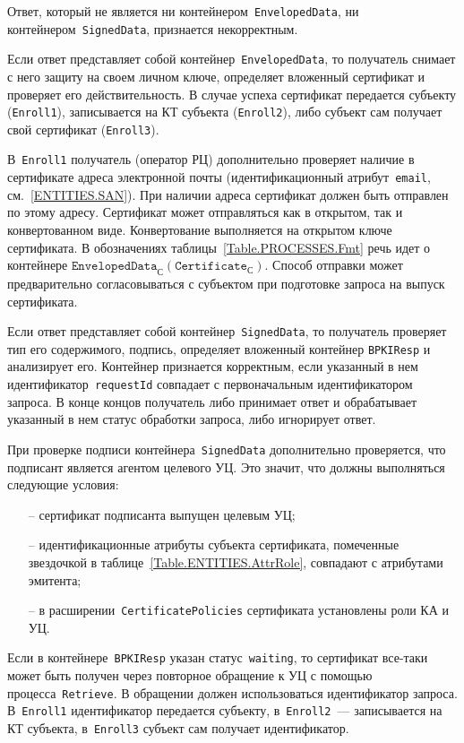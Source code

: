 Ответ, который не является ни контейнером~\texttt{EnvelopedData},
ни контейнером~\texttt{SignedData}, признается некорректным.

Если ответ представляет собой контейнер~\texttt{EnvelopedData}, 
то получатель снимает с него защиту на своем личном ключе, определяет 
вложенный сертификат и проверяет его действительность. 
%
В случае успеха сертификат передается субъекту (\texttt{Enroll1}),
записывается на КТ субъекта (\texttt{Enroll2}),
либо субъект сам получает свой сертификат (\texttt{Enroll3}).

В~\texttt{Enroll1} получатель (оператор РЦ) дополнительно 
проверяет наличие в сертификате адреса электронной почты 
(идентификационный атрибут~\texttt{email}, см.~\ref{ENTITIES.SAN}). 
При наличии адреса сертификат должен быть отправлен по этому адресу. 
Сертификат может отправляться как в открытом, так и 
конвертованном виде.
%
Конвертование выполняется на открытом ключе сертификата.
В обозначениях таблицы~\ref{Table.PROCESSES.Fmt}
речь идет о контейнере
$\texttt{EnvelopedData}_{\text{С}}(\texttt{Certificate}_{\text{С}})$.
%
Способ отправки может предварительно согласовываться с субъектом при 
подготовке запроса на выпуск сертификата.

Если ответ представляет собой контейнер~\texttt{SignedData}, 
то получатель проверяет тип его содержимого, подпись, 
определяет вложенный контейнер \texttt{BPKIResp} и анализирует его. 
Контейнер признается корректным, если указанный в нем 
идентификатор~\texttt{requestId} совпадает с первоначальным 
идентификатором запроса.
%
В конце концов получатель либо принимает ответ и обрабатывает указанный 
в нем статус обработки запроса, либо игнорирует ответ.

При проверке подписи контейнера~\texttt{SignedData} дополнительно 
проверяется, что подписант является агентом целевого УЦ.
Это значит, что должны выполняться следующие условия:
\begin{itemize}
\item[--]
сертификат подписанта выпущен целевым УЦ;
\item[--]
идентификационные атрибуты субъекта сертификата,
помеченные звездочкой в таблице~\ref{Table.ENTITIES.AttrRole},
совпадают с атрибутами эмитента;
\item[--]
в расширении~\texttt{CertificatePolicies} сертификата установлены роли КА 
и УЦ. 
\end{itemize}

Если в контейнере~\texttt{BPKIResp} указан статус~\texttt{waiting}, то сертификат 
все-таки может быть получен через повторное обращение к УЦ с помощью 
процесса~\texttt{Retrieve}. В обращении должен использоваться 
идентификатор запроса. 
%
В~\texttt{Enroll1} идентификатор передается субъекту,
в~\texttt{Enroll2}~--- записывается на КТ субъекта,
в~\texttt{Enroll3} субъект сам получает идентификатор.

